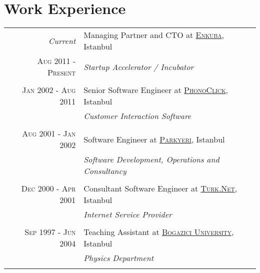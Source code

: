 \documentclass[a4paper,10pt]{article}
\begin{document}
\section{Work Experience}
\begin{tabular}{r|p{11cm}}
  \emph{Current}                & Managing Partner and CTO at \href{http://www.enkuba.com}{\textsc{Enkuba}}, Istanbul \\
  \textsc{Aug 2011 - Present}   & \emph{Startup Accelerator / Incubator} \\

  \multicolumn{2}{c}{} \\

  \textsc{Jan 2002 - Aug 2011}  & Senior Software Engineer at \href{http://www.phonoclick.com}{\textsc{PhonoClick}}, Istanbul \\
                                & \emph{Customer Interaction Software}  \\

  \multicolumn{2}{c}{} \\
 
  \textsc{Aug 2001 - Jan 2002}  & Software Engineer at \href{http://www.parkyeri.com}{\textsc{Parkyeri}}, Istanbul \\ 
                                & \emph{Software Development, Operations and Consultancy} \\

  \multicolumn{2}{c}{} \\

  \textsc{Dec 2000 - Apr 2001}  & Consultant Software Engineer at \href{http://turk.net/}{\textsc{Turk.Net}}, Istanbul \\ 
                                & \emph{Internet Service Provider} \\

  \multicolumn{2}{c}{} \\

  \textsc{Sep 1997 - Jun 2004}  & Teaching Assistant at \href{http://www.boun.edu.tr/}{\textsc{Bogazici University}}, Istanbul \\ 
                                & \emph{Physics Department} \\

  \multicolumn{2}{c}{} \\

\end{tabular}

\end{document}
